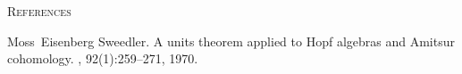 \begin{center}
	{\normalsize \textsc{References}}
\end{center}


\begin{thebibliography}{Swe70}

%

Moss~Eisenberg Sweedler.
\newblock A units theorem applied to {H}opf algebras and {A}mitsur cohomology.
, 92(1):259--271, 1970.

\end{thebibliography}


\endgroup